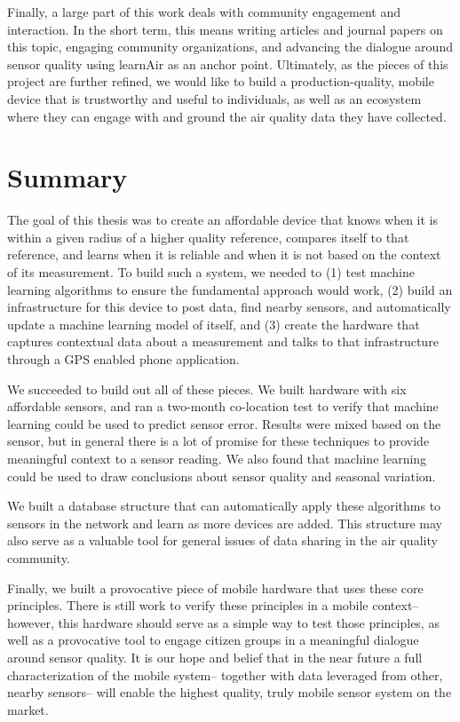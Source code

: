 Finally, a large part of this work deals with community engagement and interaction.  In the short term, this means writing articles and journal papers on this topic, engaging community organizations, and advancing the dialogue around sensor quality using learnAir as an anchor point.  Ultimately, as the pieces of this project are further refined, we would like to build a production-quality, mobile device that is trustworthy and useful to individuals, as well as an ecosystem where they can engage with and ground the air quality data they have collected.


\section{Summary}

The goal of this thesis was to create an affordable device that knows when it is within a given radius of a higher quality reference, compares itself to that reference, and learns when it is reliable and when it is not based on the context of its measurement.  To build such a system, we needed to (1) test machine learning algorithms to ensure the fundamental approach would work, (2) build an infrastructure for this device to post data, find nearby sensors, and automatically update a machine learning model of itself, and (3) create the hardware that captures contextual data about a measurement and talks to that infrastructure through a GPS enabled phone application.

We succeeded to build out all of these pieces.  We built hardware with six affordable sensors, and ran a two-month co-location test to verify that machine learning could be used to predict sensor error.  Results were mixed based on the sensor, but in general there is a lot of promise for these techniques to provide meaningful context to a sensor reading.  We also found that machine learning could be used to draw conclusions about sensor quality and seasonal variation.  

We built a database structure that can automatically apply these algorithms to sensors in the network and learn as more devices are added.  This structure may also serve as a valuable tool for general issues of data sharing in the air quality community.

Finally, we built a provocative piece of mobile hardware that uses these core principles.  There is still work to verify these principles in a mobile context-- however, this hardware should serve as a simple way to test those principles, as well as a provocative tool to engage citizen groups in a meaningful dialogue around sensor quality.  It is our hope and belief that in the near future a full characterization of the mobile system-- together with data leveraged from other, nearby sensors-- will enable the highest quality, truly mobile sensor system on the market.  








